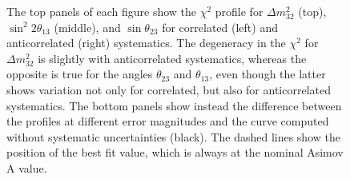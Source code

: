 \begin{figure}
	\centering
	\resizebox{0.49\linewidth}{!}{}
	\resizebox{0.49\linewidth}{!}{}
	\resizebox{0.49\linewidth}{!}{}
	\resizebox{0.49\linewidth}{!}{}
	\resizebox{0.49\linewidth}{!}{}
	\resizebox{0.49\linewidth}{!}{}
	\caption[$\chi^2$ profiles for $\Delta m_{32}^2$, $\sin^2 2\theta_{13}$, and $\sin\theta_{23}$ with a simplified systematic model]%
		{The top panels of each figure show the $\chi^2$ profile for %
		$\Delta m_{32}^2$ (top), $\sin^2 2\theta_{13}$ (middle), and $\sin\theta_{23}$ 
		for correlated (left) and anticorrelated (right) systematics. 
		The degeneracy in the $\chi^2$ for $\Delta m_{32}^2$ is slightly with anticorrelated systematics, %
		whereas the opposite is true for the angles $\theta_{23}$ and $\theta_{13}$, %
		even though the latter shows variation not only for correlated, but also for anticorrelated systematics.
		The bottom panels show instead the difference between the profiles at different error magnitudes and %
		the curve computed without systematic uncertainties (black).
		The dashed lines show the position of the best fit value, which is always at the nominal Asimov A value.}
	\label{fig:nuenorm_mass_angles}
\end{figure}

